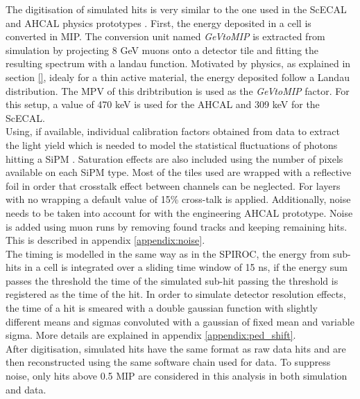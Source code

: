 The digitisation of simulated hits is very similar to the one used in the ScECAL and AHCAL physics prototypes \cite{2011_JINST_6_P04003}. First, the energy deposited in a cell is converted in MIP. The conversion unit named \textit{GeVtoMIP} is extracted from simulation by projecting 8 GeV muons onto a detector tile and fitting the resulting spectrum with a landau function. Motivated by physics, as explained in section \ref{}, idealy for a thin active material, the energy deposited follow a Landau distribution. The MPV of this dribtribution is used as the \textit{GeVtoMIP} factor. For this setup, a value of 470 keV is used for the AHCAL and 309 keV for the ScECAL.\\

Using, if available, individual calibration factors obtained from data to extract the light yield which is needed to model the statistical fluctuations of photons hitting a SiPM \cite{Hartbrich:2016bbz}. Saturation effects are also included using the number of pixels available on each SiPM type. Most of the tiles used are wrapped with a reflective foil in order that crosstalk effect between channels can be neglected. For layers with no wrapping a default value of 15\% cross-talk is applied. Additionally, noise needs to be taken into account for with the engineering AHCAL prototype. Noise is added using muon runs by removing found tracks and keeping remaining hits. This is described in appendix \ref{appendix:noise}.\\

The timing is modelled in the same way as in the SPIROC, the energy from sub-hits in a cell is integrated over a sliding time window of 15 ns, if the energy sum passes the threshold the time of the simulated sub-hit passing the threshold is registered as the time of the hit. In order to simulate detector resolution effects, the time of a hit is smeared with a double gaussian function with slightly different means and sigmas convoluted with a gaussian of fixed mean and variable sigma. More details are explained in appendix \ref{appendix:ped_shift}.\\

After digitisation, simulated hits have the same format as raw data hits and are then reconstructed using the same software chain used for data. To suppress noise, only hits above 0.5 MIP are considered in this analysis in both simulation and data.
